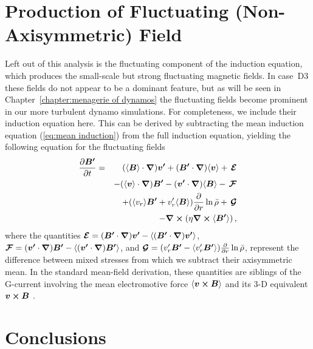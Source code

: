 \section{Production of Fluctuating (Non-Axisymmetric) Field}
Left out of this analysis is the fluctuating component of the
induction equation, which produces the small-scale but strong
fluctuating magnetic fields.  In case~D3 these fields do not appear to
be a dominant feature, but as will be seen in Chapter~\ref{chapter:menagerie of dynamos} 
the fluctuating fields become prominent in our more turbulent dynamo simulations.  
For completeness, we include their induction equation here.
This can be derived by subtracting the mean
induction equation (\ref{eq:mean induction}) from the full induction
equation, yielding the following equation for the fluctuating fields
\begin{eqnarray}\label{eq:ind4}
\frac{\partial \boldsymbol{B'}}{\partial t}&=&~\, ( \langle \boldsymbol{B} \rangle \cdot\mbox{\boldmath $\nabla$})\boldsymbol{v'} + (\boldsymbol{B'}\cdot\mbox{\boldmath $\nabla$}) \langle \boldsymbol{v} \rangle  +\, \boldsymbol{\cal E} \nonumber \\
&~&-( \langle \boldsymbol{v} \rangle \cdot\mbox{\boldmath $\nabla$})\boldsymbol{B'} - (\boldsymbol{v'}\cdot\mbox{\boldmath $\nabla$}) \langle \boldsymbol{B} \rangle  -\, \boldsymbol{\cal F} \nonumber \\
&~&+( \langle v_r \rangle \boldsymbol{B'} +  v_r' \langle \boldsymbol{B} \rangle)\frac{\partial}{\partial r}\ln \bar{\rho} +\, \boldsymbol{\cal G} \nonumber \\
&~&-\mbox{\boldmath $\nabla$}\boldsymbol{\times}(\eta\mbox{\boldmath $\nabla$}\boldsymbol{\times} \langle \boldsymbol{B'} \rangle ) \thinspace,
\end{eqnarray}
where the quantities $\boldsymbol{\cal E}=(\boldsymbol{B'}\cdot\mbox{\boldmath $\nabla$})\boldsymbol{v'}- \langle (\boldsymbol{B'}\cdot\mbox{\boldmath $\nabla$})\boldsymbol{v'} \rangle $, 
$\boldsymbol{\cal F}=(\boldsymbol{v'}\cdot\mbox{\boldmath $\nabla$})\boldsymbol{B'}- \langle (\boldsymbol{v'}\cdot\mbox{\boldmath $\nabla$})\boldsymbol{B'} \rangle $, and 
$\boldsymbol{\cal G}=(v_r'\boldsymbol{B'}- \langle v_r'\boldsymbol{B'} \rangle )\frac{\partial}{\partial r}\ln \bar{\rho}$, represent the difference between mixed
stresses from which we subtract their axisymmetric mean. In the standard mean-field derivation, these quantities 
are siblings of the G-current involving the mean electromotive force $ \langle \boldsymbol{v}\boldsymbol{\times}\boldsymbol{B} \rangle $ and its 3-D equivalent 
$\boldsymbol{v}\boldsymbol{\times}\boldsymbol{B}$ \citep[i.e., the so called ``pain in the neck'' term,][]{Moffatt_1978}.


\section{Conclusions}
\label{sec:conclusions}

